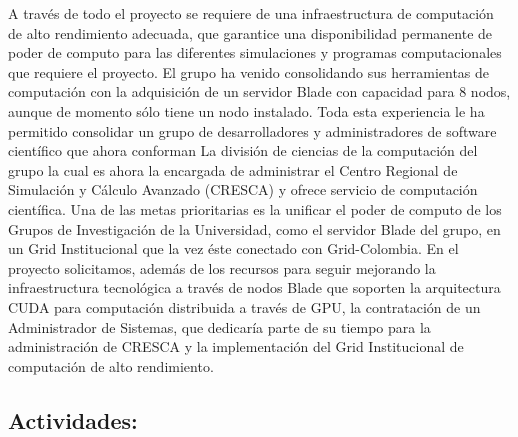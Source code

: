 A través de todo el proyecto se requiere de una infraestructura de
computación de alto rendimiento adecuada, que garantice una
disponibilidad permanente de poder de computo para las diferentes
simulaciones y programas computacionales que requiere el proyecto. El
grupo ha venido consolidando sus herramientas de computación con la
adquisición de un servidor Blade con capacidad para 8 nodos, aunque de
momento sólo tiene un nodo instalado. Toda esta experiencia le ha
permitido consolidar un grupo de desarrolladores y administradores de
software científico que ahora conforman La división de ciencias de la
computación del grupo la cual es ahora la encargada de administrar el
Centro Regional de Simulación y Cálculo Avanzado (CRESCA) y ofrece
servicio de computación científica.  Una de las metas prioritarias es
la unificar el poder de computo de los Grupos de Investigación de la
Universidad, como el servidor Blade del grupo, en un Grid
Institucional que la vez éste conectado con Grid-Colombia. En el
proyecto solicitamos, además de los recursos para seguir mejorando la
infraestructura tecnológica a través de nodos Blade que soporten la
arquitectura CUDA para computación distribuida a través de GPU, la
contratación de un Administrador de Sistemas, que dedicaría parte de
su tiempo para la administración de CRESCA y la implementación del
Grid Institucional de computación de alto rendimiento.



\subsection{Actividades:                                   }

